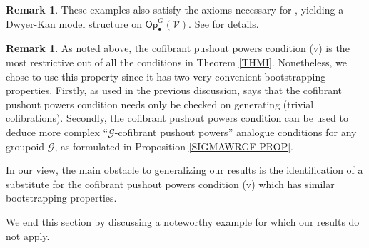 \documentclass[a4paper,10pt
,draft
]{article}%
\numberwithin{equation}{section}
\numberwithin{figure}{section}
\theoremstyle{definition} %
\newtheorem{remark}[equation]{Remark}%
\newcommand{\Op}{\mathsf{Op}}%
\newcommand{\V}{\ensuremath{\mathcal V}}
\newcommand{\G}{\ensuremath{\mathcal G}}
\newcommand{\1}{\ensuremath{\mathbbm 1}}%
\begin{document}
\begin{remark}
        These examples also satisfy the axioms necessary for \cite[Thm. \ref{AC-THMA}]{BP_ACOP},
        yielding a Dwyer-Kan model structure on $\Op_\bullet^G(\V)$.
        See \cite[\textcolor{red}{\S 1.2}]{BP_ACOP} for details.
\end{remark}


\begin{remark}\label{CPPWHY REM}
	As noted above, the cofibrant pushout powers
	condition (v) is the most restrictive 
	out of all the conditions in 
	Theorem \ref{THMI}. %
	Nonetheless, we chose to use this property 
	since it has two very convenient bootstrapping properties.
	Firstly, as used in the previous discussion, \cite[Rmk. 6.17]{BP_geo}
	says that the cofibrant pushout powers condition needs only be checked on generating (trivial cofibrations).
	Secondly, the cofibrant pushout powers condition 
	can be used to deduce more complex
	``$\G$-cofibrant pushout powers'' analogue conditions for any groupoid $\G$,
	as formulated in Proposition \ref{SIGMAWRGF PROP}.
	
	In our view, the main obstacle to generalizing our results is the identification of 
	a substitute for the cofibrant pushout powers condition (v)
	which has similar bootstrapping properties.
\end{remark}



We end this section by discussing a noteworthy 
example for which our results do not apply.
\end{document}
